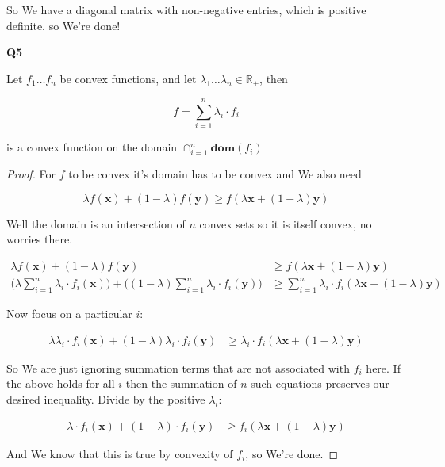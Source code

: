 \documentclass{article}
\begin{document}
		So We have a diagonal matrix with non-negative entries, which is positive definite. so We're done!
		
	\textbf{Q5}
	
		Let $f_1\ldots f_n$ be convex functions, and let $\lambda_1\ldots\lambda_n \in \mathbb{R}_+$, then 
		
		\[ f = \sum^n_{i=1} \lambda_i\cdot f_i \]
		
		is a convex function on the domain $\cap^n_{i=1} \mathbf{dom}(f_i)$
		
		\begin{proof}
		
			For $f$ to be convex it's domain has to be convex and We also need
			
			\[\lambda f(\mathbf{x}) + (1-\lambda)f(\mathbf{y}) \ge f(\lambda\mathbf{x} + (1-\lambda)\mathbf{y}) \]
			
			Well the domain is an intersection of $n$ convex sets so it is itself convex, no worries there.
			
			\begin{align}
				\lambda f(\mathbf{x}) + (1-\lambda)f(\mathbf{y}) &\ge f(\lambda\mathbf{x} + (1-\lambda)\mathbf{y})\\
				\bigg(\lambda  \sum^n_{i=1} \lambda_i\cdot f_i(\mathbf{x})\bigg) + \bigg((1-\lambda) \sum^n_{i=1} \lambda_i\cdot f_i(\mathbf{y})\bigg) &\ge  \sum^n_{i=1} \lambda_i\cdot f_i(\lambda\mathbf{x} + (1-\lambda)\mathbf{y})
			\end{align}
			
			Now focus on a particular $i$:
			
			\begin{align}
				\lambda  \lambda_i\cdot f_i(\mathbf{x}) +(1-\lambda) \lambda_i\cdot f_i(\mathbf{y}) &\ge \lambda_i\cdot f_i(\lambda\mathbf{x} + (1-\lambda)\mathbf{y})
			\end{align}
			
			So We are just ignoring  summation terms that are not associated with $f_i$ here. If the above holds for all $i$ then the summation of $n$ such equations preserves our desired inequality. Divide by the positive $\lambda_i$:
			
			\begin{align}
				\lambda \cdot f_i(\mathbf{x}) +(1-\lambda) \cdot f_i(\mathbf{y}) &\ge  f_i(\lambda\mathbf{x} + (1-\lambda)\mathbf{y})
			\end{align}
			
			And We know that this is true by convexity of $f_i$, so We're done.
			

\end{proof}
\end{document}
